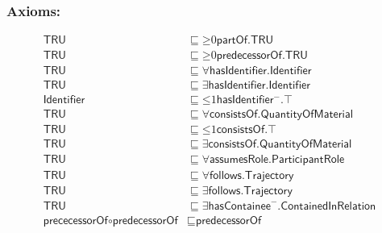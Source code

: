 \subsubsection*{Axioms:}
\begin{align}
    \textsf{TRU} &\sqsubseteq \mathord{\geq}0 \textsf{partOf.TRU}\\
    \textsf{TRU} &\sqsubseteq \mathord{\geq}0 \textsf{predecessorOf.TRU}\\
    \textsf{TRU} &\sqsubseteq \forall\textsf{hasIdentifier.Identifier}\\
    \textsf{TRU} &\sqsubseteq \exists\textsf{hasIdentifier.Identifier}\\
    \textsf{Identifier} &\sqsubseteq \mathord{\leq} 1\textsf{hasIdentifier}\mathord{^-}.\top\\
    \textsf{TRU} &\sqsubseteq \forall\textsf{consistsOf.QuantityOfMaterial}\\
    \textsf{TRU} &\sqsubseteq \mathord{\leq} 1 \textsf{consistsOf}.\top\\
    \textsf{TRU} &\sqsubseteq \exists\textsf{consistsOf.QuantityOfMaterial}\\
    \textsf{TRU} &\sqsubseteq \forall\textsf{assumesRole.ParticipantRole}\\
    \textsf{TRU} &\sqsubseteq \forall\textsf{follows.Trajectory}\\
    \textsf{TRU} &\sqsubseteq \exists\textsf{follows.Trajectory}\\
    \textsf{TRU} &\sqsubseteq \exists\textsf{hasContainee}^-.\textsf{ContainedInRelation}\\
    \textsf{prececessorOf} \circ \textsf{predecessorOf} &\sqsubseteq \textsf{predecessorOf}
\end{align}

